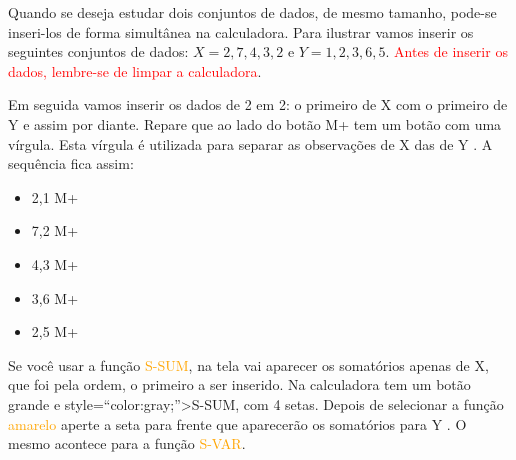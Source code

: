 \documentclass[
]{book}
\providecommand{\tightlist}{%
  \setlength{\itemsep}{0pt}\setlength{\parskip}{0pt}}
\begin{document}
Quando se deseja estudar dois conjuntos de dados, de mesmo tamanho, pode-se inseri-los de forma simultânea na calculadora. Para ilustrar vamos inserir os seguintes conjuntos de dados: \(X={2,7,4,3,2}\) e \(Y={1,2,3,6,5}\). \textcolor{red}{Antes de inserir os dados, lembre-se de limpar a calculadora}.

Em seguida vamos inserir os dados de 2 em 2: o primeiro de X com o primeiro de Y e assim por diante. Repare que ao lado do botão M+ tem um botão com uma vírgula. Esta vírgula é utilizada para separar as observações de X das de Y . A sequência fica assim:

\begin{itemize}
\tightlist
\item
  2,1 M+
\item
  7,2 M+
\item
  4,3 M+
\item
  3,6 M+
\item
  2,5 M+
\end{itemize}

Se você usar a função \textcolor{orange}{S-SUM}, na tela vai aparecer os somatórios apenas de X, que foi pela ordem, o primeiro a ser inserido. Na calculadora tem um botão grande e style=``color:gray;''\textgreater S-SUM, com 4 setas. Depois de selecionar a função \textcolor{orange}{amarelo} aperte a seta para frente que aparecerão os somatórios para Y . O mesmo acontece para a função \textcolor{orange}{S-VAR}.
\end{document}
